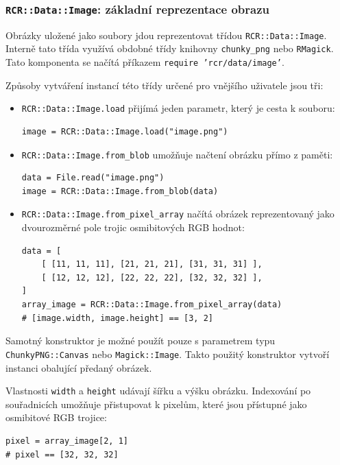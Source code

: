 \documentclass[a4paper]{article}
\begin{document}
\subsubsection{\texttt{RCR::Data::Image}: základní reprezentace obrazu}
Obrázky uložené jako soubory jdou reprezentovat třídou
\texttt{RCR::Data::Image}. Interně tato třída využívá obdobné třídy knihovny
\texttt{chunky\_png} nebo \texttt{RMagick}.
Tato komponenta se načítá příkazem \texttt{require 'rcr/data/image'}.

Způsoby vytváření instancí této třídy určené pro vnějšího uživatele jsou tři:
\begin{itemize}
\item \texttt{RCR::Data::Image.load} přijímá jeden parametr, který je cesta k
souboru:
\begin{lstlisting}
image = RCR::Data::Image.load("image.png")
\end{lstlisting}
\item \texttt{RCR::Data::Image.from\_blob} umožňuje načtení obrázku přímo z
paměti:
\begin{lstlisting}
data = File.read("image.png")
image = RCR::Data::Image.from_blob(data)
\end{lstlisting}
\item \texttt{RCR::Data::Image.from\_pixel\_array} načítá obrázek reprezentovaný
jako dvourozměrné pole trojic osmibitových RGB hodnot:
\begin{lstlisting}
data = [
	[ [11, 11, 11], [21, 21, 21], [31, 31, 31] ],
	[ [12, 12, 12], [22, 22, 22], [32, 32, 32] ],
]
array_image = RCR::Data::Image.from_pixel_array(data)
# [image.width, image.height] == [3, 2]
\end{lstlisting}
\end{itemize}

Samotný konstruktor je možné použít pouze s parametrem typu
\texttt{ChunkyPNG::Canvas} nebo \texttt{Magick::Image}. Takto použitý
konstruktor vytvoří instanci obalující předaný obrázek.

Vlastnosti \texttt{width} a \texttt{height} udávají šířku a výšku obrázku.
Indexování po souřadnicích umožňuje přistupovat k pixelům, které jsou přístupné
jako osmibitové RGB trojice:
\begin{lstlisting}
pixel = array_image[2, 1]
# pixel == [32, 32, 32]
\end{lstlisting}
\end{document}
